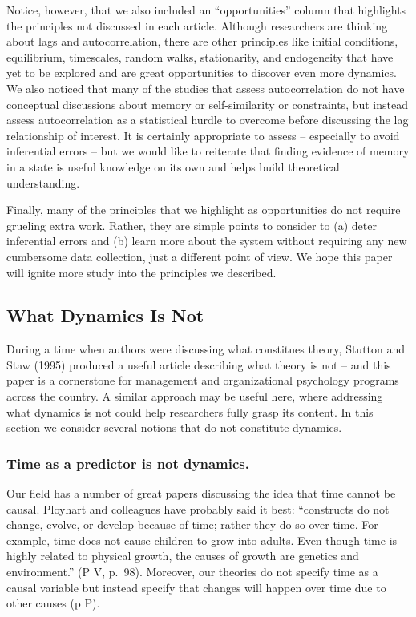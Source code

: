 \documentclass[english,,man]{apa6}
\theoremstyle{definition}
\theoremstyle{definition}
\theoremstyle{definition}
\theoremstyle{remark}
\begin{document}
Notice, however, that we also included an \enquote{opportunities} column
that highlights the principles not discussed in each article. Although
researchers are thinking about lags and autocorrelation, there are other
principles like initial conditions, equilibrium, timescales, random
walks, stationarity, and endogeneity that have yet to be explored and
are great opportunities to discover even more dynamics. We also noticed
that many of the studies that assess autocorrelation do not have
conceptual discussions about memory or self-similarity or constraints,
but instead assess autocorrelation as a statistical hurdle to overcome
before discussing the lag relationship of interest. It is certainly
appropriate to assess -- especially to avoid inferential errors -- but
we would like to reiterate that finding evidence of memory in a state is
useful knowledge on its own and helps build theoretical understanding.

Finally, many of the principles that we highlight as opportunities do
not require grueling extra work. Rather, they are simple points to
consider to (a) deter inferential errors and (b) learn more about the
system without requiring any new cumbersome data collection, just a
different point of view. We hope this paper will ignite more study into
the principles we described.

\hypertarget{what-dynamics-is-not}{%
\subsection{What Dynamics Is Not}\label{what-dynamics-is-not}}

During a time when authors were discussing what constitues theory,
Stutton and Staw (1995) produced a useful article describing what theory
is not -- and this paper is a cornerstone for management and
organizational psychology programs across the country. A similar
approach may be useful here, where addressing what dynamics is not could
help researchers fully grasp its content. In this section we consider
several notions that do not constitute dynamics.

\hypertarget{time-as-a-predictor-is-not-dynamics.}{%
\subsubsection{Time as a predictor is not
dynamics.}\label{time-as-a-predictor-is-not-dynamics.}}

Our field has a number of great papers discussing the idea that time
cannot be causal. Ployhart and colleagues have probably said it best:
\enquote{constructs do not change, evolve, or develop because of time;
rather they do so over time. For example, time does not cause children
to grow into adults. Even though time is highly related to physical
growth, the causes of growth are genetics and environment.} (P V,
p.~98). Moreover, our theories do not specify time as a causal variable
but instead specify that changes will happen over time due to other
causes (p P).
\end{document}
